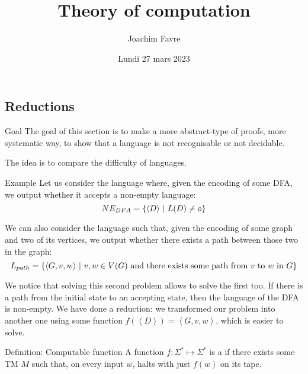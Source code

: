 \documentclass[a4paper]{article}
\title{Theory of computation}
\author{Joachim Favre}
\date{Lundi 27 mars 2023}
\begin{document}
\maketitle


\subsection{Reductions}
\begin{parag}{Goal}
    The goal of this section is to make a more abstract-type of proofs, more systematic way, to show that a language is not recognisable or not decidable.

    The idea is to compare the difficulty of languages.
\end{parag}

\begin{parag}{Example}
    Let us consider the language where, given the encoding of some DFA, we output whether it accepts a non-empty language: 
    \[NE_{DFA} = \left\{\left\langle D \right\rangle \suchthat L\left(D\right) \neq \o\right\}\]
    
    We can also consider the language such that, given the encoding of some graph and two of its vertices, we output whether there exists a path between those two in the graph: 
    \[L_{path} = \left\{\left\langle G, v, w \right\rangle \suchthat v, w \in V\left(G\right) \text{ and there exists some path from $v$ to $w$ in $G$}\right\}\]
    
    We notice that solving this second problem allows to solve the first too. If there is a path from the initial state to an accepting state, then the language of the DFA is non-empty. We have done a reduction: we transformed our problem into another one using some function $f\left(\left\langle D \right\rangle\right) = \left\langle G, v, w \right\rangle$, which is easier to solve.
\end{parag}

\begin{parag}{Definition: Computable function}
    A function $f: \Sigma^* \mapsto \Sigma^*$ is a  if there exists some TM $M$ such that, on every input $w$, halts with just $f\left(w\right)$ on its tape.
\end{parag}
\end{document}
